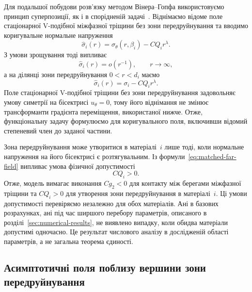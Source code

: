 Для подальшої побудови розв’язку методом Вінера--Гопфа використовуємо принцип суперпозиції, як і в спорідненій задачі~\citep{KaminskyDudykPolishchuk2024}. Віднімаємо відоме поле стаціонарної V-подібної міжфазної тріщини без зони передруйнування та вводимо коригувальне нормальне напруження
\begin{equation*}
  \widehat{\sigma}_i(r)
  =\sigma_\theta(r,\beta_i)-CQ_i r^\lambda.
\end{equation*}
З умови зрощування тоді випливає
\begin{equation*}
  \widehat{\sigma}_i(r)=o(r^{-1}),
  \qquad r\to\infty,
\end{equation*}
а на ділянці зони передруйнування $0<r<d_i$ маємо
\begin{equation*}
  \widehat{\sigma}_i(r)
  =\sigma_i-CQ_i r^\lambda.
\end{equation*}
Поле стаціонарної V-подібної тріщини без зони передруйнування задовольняє умову симетрії на бісектрисі $u_\theta=0$, тому його віднімання не змінює трансформанти градієнта переміщення, використаної нижче. Отже, функціональну задачу формулюємо для коригувального поля, включивши відомий степеневий член до заданої частини.

Зона передруйнування може утворитися в матеріалі~$i$ лише тоді, коли нормальне напруження на його бісектрисі є розтягувальним. Із формули~\eqref{eq:matched-far-field} випливає умова фізичної допустимості
\begin{equation*}
  CQ_i>0.
\end{equation*}
Отже, модель вимагає виконання $Cg_2<0$ для контакту між берегами міжфазної тріщини та $CQ_i>0$ для утворення зони передруйнування в матеріалі~$i$. Ці умови допустимості перевіряємо незалежно для обох матеріалів. Ані в базових розрахунках, ані під час ширшого перебору параметрів, описаного в розділі~\ref{sec:numerical-results}, не виявлено випадку, коли обидва матеріали допустимі одночасно. Це результат числового аналізу в дослідженій області параметрів, а не загальна теорема єдиності.

\subsection{Асимптотичні поля поблизу вершини зони передруйнування}
\label{subsec:zone-tip-asymptotics}

